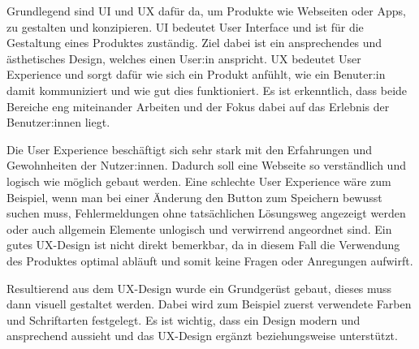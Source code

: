 Grundlegend sind UI und UX dafür da, um Produkte wie Webseiten oder Apps, zu gestalten und konzipieren. UI bedeutet User Interface und ist für die Gestaltung eines Produktes zuständig. Ziel dabei ist ein ansprechendes und ästhetisches Design, welches einen User:in anspricht. UX bedeutet User Experience und sorgt dafür wie sich ein Produkt anfühlt, wie ein Benuter:in damit kommuniziert und wie gut dies funktioniert. Es ist erkenntlich, dass beide Bereiche eng miteinander Arbeiten und der Fokus dabei auf das Erlebnis der Benutzer:innen liegt.

Die User Experience beschäftigt sich sehr stark mit den Erfahrungen und Gewohnheiten der Nutzer:innen. Dadurch soll eine Webseite so verständlich und logisch wie möglich gebaut werden. Eine schlechte User Experience wäre zum Beispiel, wenn man bei einer Änderung den Button zum Speichern bewusst suchen muss, Fehlermeldungen ohne tatsächlichen Lösungsweg angezeigt werden oder auch allgemein Elemente unlogisch und verwirrend angeordnet sind. Ein gutes UX-Design ist nicht direkt bemerkbar, da in diesem Fall die Verwendung des Produktes optimal abläuft und somit keine Fragen oder Anregungen aufwirft.

Resultierend aus dem UX-Design wurde ein Grundgerüst gebaut, dieses muss dann visuell gestaltet werden. Dabei wird zum Beispiel zuerst verwendete Farben und Schriftarten festgelegt. Es ist wichtig, dass ein Design modern und ansprechend aussieht und das UX-Design ergänzt beziehungsweise unterstützt.